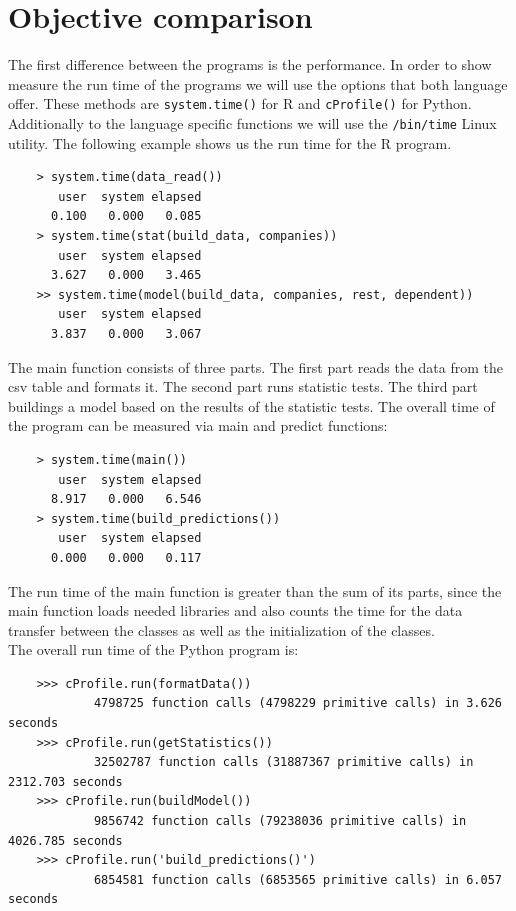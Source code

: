 \documentclass[
  twoside,
  11pt, a4paper,
  footinclude=true,
  headinclude=true,
  cleardoublepage=empty
]{scrreprt}
\begin{document}
    \section{Objective comparison}
    The first difference between the programs is the performance. In order to show measure the run time of the programs we will use the options that both language offer. These methods are \texttt{system.time()} for R and \texttt{cProfile()} for Python. Additionally to the language specific functions we will use the \texttt{/bin/time} Linux utility. The following example shows us the run time for the R program.
    \begin{verbatim}
    > system.time(data_read())                                                  
       user  system elapsed                                                         
      0.100   0.000   0.085  
    > system.time(stat(build_data, companies))
       user  system elapsed 
      3.627   0.000   3.465
    >> system.time(model(build_data, companies, rest, dependent))
       user  system elapsed 
      3.837   0.000   3.067 
    \end{verbatim}
    The main function consists of three parts. The first part reads the data from the csv table and formats it. The second part runs statistic tests. The third part buildings a model based on the results of the statistic tests. The overall time of the program can be measured via main and predict functions:
    \begin{verbatim}
    > system.time(main())
       user  system elapsed 
      8.917   0.000   6.546 
    > system.time(build_predictions())
       user  system elapsed 
      0.000   0.000   0.117 
    \end{verbatim}
    The run time of the main function is greater than the sum of its parts, since the main function loads needed libraries and also counts the time for the data transfer between the classes as well as the initialization of the classes.\\
    The overall run time of the Python program is:
    \begin{verbatim}
    >>> cProfile.run(formatData())
            4798725 function calls (4798229 primitive calls) in 3.626 seconds
    >>> cProfile.run(getStatistics())
            32502787 function calls (31887367 primitive calls) in 2312.703 seconds
    >>> cProfile.run(buildModel())
            9856742 function calls (79238036 primitive calls) in 4026.785 seconds
    >>> cProfile.run('build_predictions()')
            6854581 function calls (6853565 primitive calls) in 6.057 seconds
    \end{verbatim}
\end{document}
